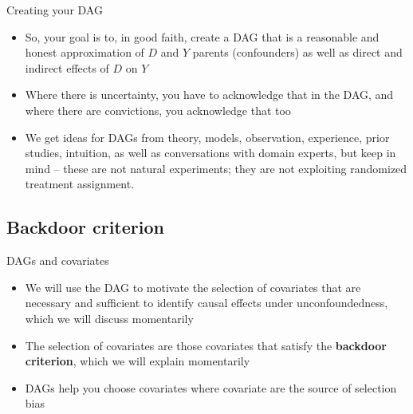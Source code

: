 \documentclass{beamer}
\begin{document}
\begin{frame}{Creating your DAG}

	\begin{itemize}
	\item So, your goal is to, in good faith, create a DAG that is a reasonable and honest approximation of $D$ and $Y$ parents (confounders) as well as direct and indirect effects of $D$ on $Y$
	\item Where there is uncertainty, you have to acknowledge that in the DAG, and where there are convictions, you acknowledge that too
	\item We get ideas for DAGs from theory, models, observation, experience, prior studies, intuition, as well as conversations with domain experts, but keep in mind -- these are not natural experiments; they are not exploiting randomized treatment assignment.  
	\end{itemize}

\end{frame}







\subsection{Backdoor criterion}

\begin{frame}{DAGs and covariates}

  \begin{itemize}
	\item We will use the DAG to motivate the selection of covariates that are necessary and sufficient to identify causal effects under unconfoundedness, which we will discuss momentarily
    \item The selection of covariates are those covariates that satisfy the \textbf{backdoor criterion}, which we will explain momentarily
    \item  DAGs help you choose covariates where covariate are the source of selection bias
  \end{itemize}

\end{frame}
\end{document}
